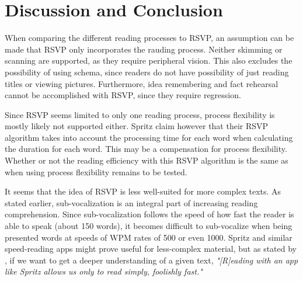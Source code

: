 \section{Discussion and Conclusion}
When comparing the different reading processes to RSVP, an assumption can be made that RSVP only incorporates the rauding process. Neither skimming or scanning are supported, as they require peripheral vision. This also excludes the possibility of using schema, since readers do not have possibility of just reading titles or viewing pictures. Furthermore, idea remembering and fact rehearsal cannot be accomplished with RSVP, since they require regression. 

Since RSVP seems limited to only one reading process, process flexibility is mostly likely not supported either. Spritz claim however that their RSVP algorithm takes into account the processing time for each word when calculating the duration for each word. This may be a compensation for process flexibility. Whether or not the reading efficiency with this RSVP algorithm is the same as when using process flexibility remains to be tested.

It seems that the idea of RSVP is less well-suited for more complex texts. As stated earlier, sub-vocalization is an integral part of increasing reading comprehension. Since sub-vocalization follows the speed of how fast the reader is able to speak (about 150 words), it becomes difficult to sub-vocalize when being presented words at speeds of WPM rates of 500 or even 1000. Spritz and similar speed-reading apps might prove useful for less-complex material, but as stated by , if we want to get a deeper understanding of a given text, \emph{"[R]eading with an app like Spritz allows us only to read simply, foolishly fast."}